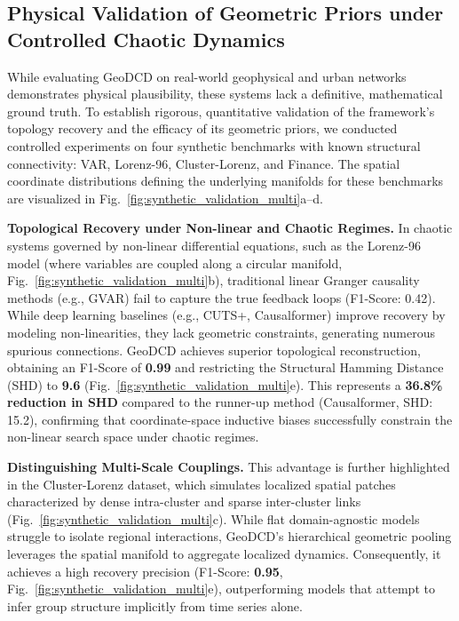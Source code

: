 \documentclass{article}
\begin{document}
\subsection{Physical Validation of Geometric Priors under Controlled Chaotic Dynamics}
While evaluating GeoDCD on real-world geophysical and urban networks demonstrates physical plausibility, these systems lack a definitive, mathematical ground truth. To establish rigorous, quantitative validation of the framework's topology recovery and the efficacy of its geometric priors, we conducted controlled experiments on four synthetic benchmarks with known structural connectivity: VAR, Lorenz-96, Cluster-Lorenz, and Finance. The spatial coordinate distributions defining the underlying manifolds for these benchmarks are visualized in Fig.~\ref{fig:synthetic_validation_multi}a--d.

\textbf{Topological Recovery under Non-linear and Chaotic Regimes.}
In chaotic systems governed by non-linear differential equations, such as the Lorenz-96 model (where variables are coupled along a circular manifold, Fig.~\ref{fig:synthetic_validation_multi}b), traditional linear Granger causality methods (e.g., GVAR) fail to capture the true feedback loops (F1-Score: 0.42). While deep learning baselines (e.g., CUTS+, Causalformer) improve recovery by modeling non-linearities, they lack geometric constraints, generating numerous spurious connections. GeoDCD achieves superior topological reconstruction, obtaining an F1-Score of \textbf{0.99} and restricting the Structural Hamming Distance (SHD) to \textbf{9.6} (Fig.~\ref{fig:synthetic_validation_multi}e). This represents a \textbf{36.8\% reduction in SHD} compared to the runner-up method (Causalformer, SHD: 15.2), confirming that coordinate-space inductive biases successfully constrain the non-linear search space under chaotic regimes.

\textbf{Distinguishing Multi-Scale Couplings.}
This advantage is further highlighted in the Cluster-Lorenz dataset, which simulates localized spatial patches characterized by dense intra-cluster and sparse inter-cluster links (Fig.~\ref{fig:synthetic_validation_multi}c). While flat domain-agnostic models struggle to isolate regional interactions, GeoDCD's hierarchical geometric pooling leverages the spatial manifold to aggregate localized dynamics. Consequently, it achieves a high recovery precision (F1-Score: \textbf{0.95}, Fig.~\ref{fig:synthetic_validation_multi}e), outperforming models that attempt to infer group structure implicitly from time series alone.
\end{document}
